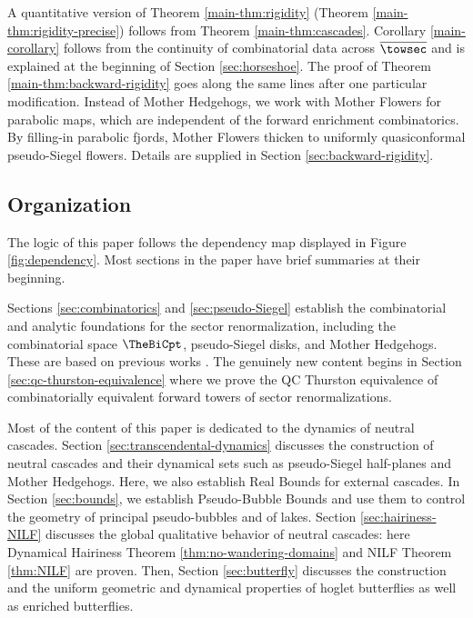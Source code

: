 \documentclass{amsart}
\begin{document}
A quantitative version of Theorem \ref{main-thm:rigidity} (Theorem \ref{main-thm:rigidity-precise}) 
follows from Theorem \ref{main-thm:cascades}. %
Corollary \ref{main-corollary} follows from the continuity of combinatorial data across $\overline{\towsec}$ 
and is explained at the beginning of Section \ref{sec:horseshoe}. The proof of Theorem \ref{main-thm:backward-rigidity} goes along the same lines after one particular modification. Instead of Mother Hedgehogs, we work with Mother Flowers for parabolic maps, which are independent of the forward enrichment combinatorics. 
By filling-in parabolic fjords, Mother Flowers thicken to uniformly quasiconformal pseudo-Siegel flowers.
Details are supplied in Section \ref{sec:backward-rigidity}.

\subsection{Organization}
\label{ss:organization}

The logic of this paper follows the dependency map displayed in Figure \ref{fig:dependency}. Most sections in the paper have brief summaries at their beginning.


Sections \ref{sec:combinatorics} and \ref{sec:pseudo-Siegel} establish the combinatorial and analytic foundations for the  sector renormalization, including the combinatorial space $\TheBiCpt$, pseudo-Siegel disks, and Mother Hedgehogs. 
These are based on previous works \cite{DLy22,Lim26a,DLi26,DLy26a,Lim26b}.
The genuinely new content begins in Section \ref{sec:qc-thurston-equivalence} where we prove the QC Thurston equivalence of combinatorially equivalent forward towers of sector renormalizations.

Most of the content of this paper is dedicated to the dynamics of neutral cascades.
Section \ref{sec:transcendental-dynamics} discusses the construction of neutral cascades and their dynamical sets such as pseudo-Siegel half-planes and Mother Hedgehogs.
Here, we also establish Real Bounds for external cascades.
In Section \ref{sec:bounds}, we establish Pseudo-Bubble Bounds and use them to control the geometry of principal pseudo-bubbles 
and of lakes.
Section \ref{sec:hairiness-NILF} discusses the global qualitative behavior of neutral cascades:
here Dynamical Hairiness Theorem \ref{thm:no-wandering-domains} and NILF Theorem \ref{thm:NILF} are proven.
Then, Section \ref{sec:butterfly} discusses the construction and the uniform geometric and dynamical properties of hoglet butterflies as well as enriched butterflies.
\end{document}
